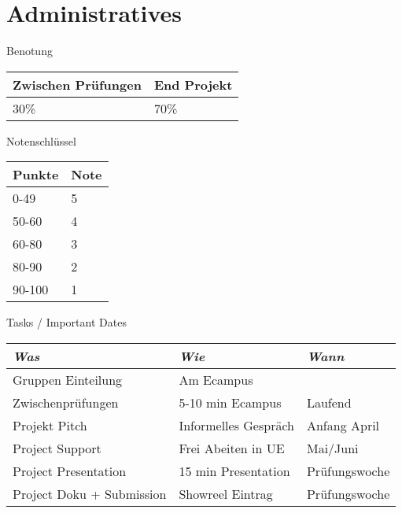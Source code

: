 
\section{Administratives}
 \frame{\sectionpage}

\begin{frame}{Benotung}

 
\begin{table}[]
\begin{tabular}{l|l}
Zwischen Prüfungen & End Projekt \\ \hline
30\%                & 70\%       
\end{tabular}
\end{table}


\end{frame}


\begin{frame}{Notenschlüssel}

 
\begin{table}[]
\begin{tabular}{l|l}
Punkte & Note \\ \hline
0-49   & 5    \\
50-60  & 4    \\
60-80  & 3    \\
80-90  & 2    \\
90-100 & 1   
\end{tabular}
\end{table}

\end{frame}


\begin{frame}{Tasks / Important Dates}
\begin{table}[]
\begin{tabular}{l|l|l}
\emph{Was}   &  \emph{Wie}             &	\emph{Wann}	\\ \hline
Gruppen Einteilung   & Am Ecampus              &		\\  
Zwischenprüfungen        & 5-10 min Ecampus              &	Laufend	\\
Projekt Pitch        & Informelles Gespräch              &	Anfang April	\\
Project Support      & Frei Abeiten in UE              &	Mai/Juni	\\
Project Presentation & 15 min Presentation & Prüfungswoche \\
Project Doku + Submission & Showreel Eintrag & Prüfungswoche
\end{tabular}
\end{table}

\end{frame}
